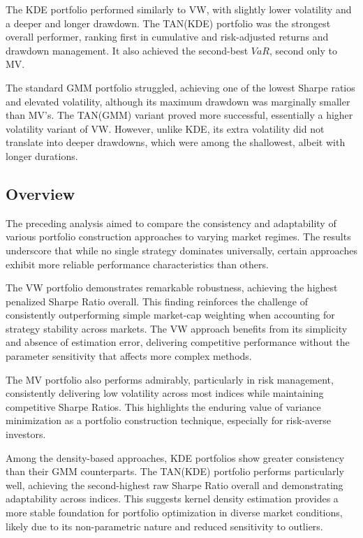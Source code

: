 The KDE portfolio performed similarly to VW, with slightly lower volatility and a deeper and longer drawdown. The TAN(KDE) portfolio was the strongest overall performer, ranking first in cumulative and risk-adjusted returns and drawdown management. It also achieved the second-best $VaR$, second only to MV.

The standard GMM portfolio struggled, achieving one of the lowest Sharpe ratios and elevated volatility, although its maximum drawdown was marginally smaller than MV's. The TAN(GMM) variant proved more successful, essentially a higher volatility variant of VW. However, unlike KDE, its extra volatility did not translate into deeper drawdowns, which were among the shallowest, albeit with longer durations.

\subsection{Overview}
The preceding analysis aimed to compare the consistency and adaptability of various portfolio construction approaches to varying market regimes. The results underscore that while no single strategy dominates universally, certain approaches exhibit more reliable performance characteristics than others.

The VW portfolio demonstrates remarkable robustness, achieving the highest penalized Sharpe Ratio overall. This finding reinforces the challenge of consistently outperforming simple market-cap weighting when accounting for strategy stability across markets. The VW approach benefits from its simplicity and absence of estimation error, delivering competitive performance without the parameter sensitivity that affects more complex methods.

The MV portfolio also performs admirably, particularly in risk management, consistently delivering low volatility across most indices while maintaining competitive Sharpe Ratios. This highlights the enduring value of variance minimization as a portfolio construction technique, especially for risk-averse investors.

Among the density-based approaches, KDE portfolios show greater consistency than their GMM counterparts. The TAN(KDE) portfolio performs particularly well, achieving the second-highest raw Sharpe Ratio overall and demonstrating adaptability across indices. This suggests kernel density estimation provides a more stable foundation for portfolio optimization in diverse market conditions, likely due to its non-parametric nature and reduced sensitivity to outliers.

